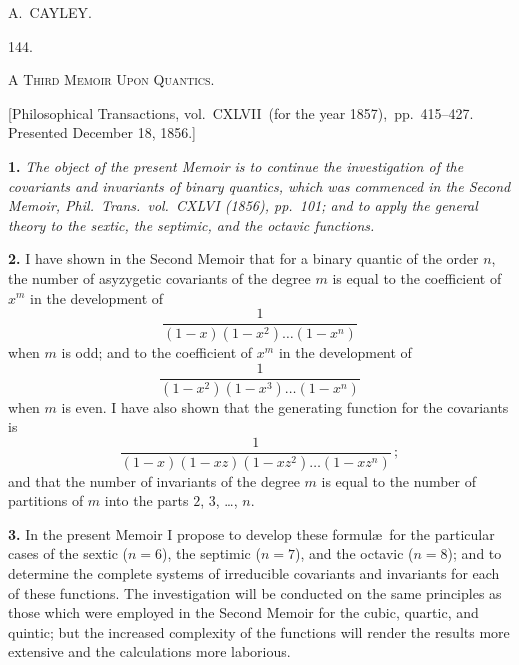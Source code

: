 \documentclass[11pt,a4paper]{article}
\begin{document}
\vspace{3ex}
\begin{flushright}
A.\ CAYLEY.
\end{flushright}


\clearpage
\setcounter{page}{311}

\begin{center}
\textsc{144.}
\end{center}

\begin{center}
\textsc{A Third Memoir Upon Quantics.}
\end{center}

\begin{center}
[Philosophical Transactions, vol.\ CXLVII\ (for the year 1857),\ pp.\ 415--427.\\
Presented December 18, 1856.]
\end{center}

\textbf{1.} \textit{The object of the present Memoir is to continue the investigation of the covariants and invariants of binary quantics, which was commenced in the Second Memoir, Phil.\ Trans.\ vol.\ CXLVI (1856), pp.\ 101; and to apply the general theory to the sextic, the septimic, and the octavic functions.}

\textbf{2.} I have shown in the Second Memoir that for a binary quantic of the order $n$, the number of asyzygetic covariants of the degree $m$ is equal to the coefficient of $x^{m}$ in the development of
\[
\frac{1}{(1-x)(1-x^{2})\ldots(1-x^{n})}
\]
when $m$ is odd; and to the coefficient of $x^{m}$ in the development of
\[
\frac{1}{(1-x^{2})(1-x^{3})\ldots(1-x^{n})}
\]
when $m$ is even. I have also shown that the generating function for the covariants is
\[
\frac{1}{(1-x)(1-xz)(1-xz^{2})\ldots(1-xz^{n})}\,;
\]
and that the number of invariants of the degree $m$ is equal to the number of partitions of $m$ into the parts $2$, $3$, \ldots, $n$.

\textbf{3.} In the present Memoir I propose to develop these formul\ae\ for the particular cases of the sextic ($n=6$), the septimic ($n=7$), and the octavic ($n=8$); and to determine the complete systems of irreducible covariants and invariants for each of these functions. The investigation will be conducted on the same principles as those which were employed in the Second Memoir for the cubic, quartic, and quintic; but the increased complexity of the functions will render the results more extensive and the calculations more laborious.
\end{document}
